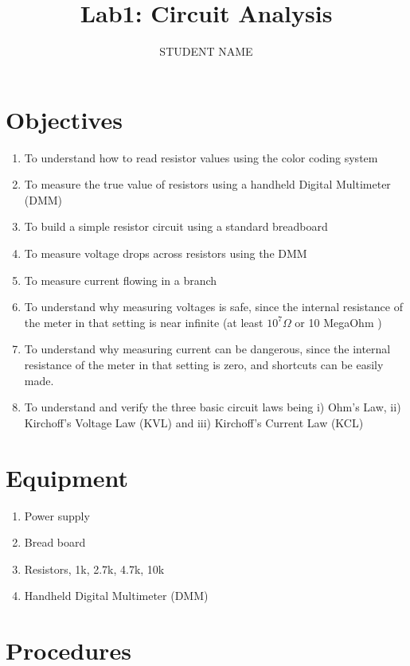 \documentclass[11pt,letterpaper]{article}
\author{STUDENT NAME}
\title{Lab1: Circuit Analysis}
\begin{document}
\maketitle

\section{Objectives}

\begin{enumerate}
\item To understand how to read resistor values using the color coding system
\item To measure the true value of resistors using a handheld Digital Multimeter (DMM)
\item To build a simple resistor circuit using a standard breadboard
\item To measure voltage drops across resistors using the DMM
\item To measure current flowing in a branch
\item To understand why measuring voltages is safe, since the internal resistance of the meter in that setting is near infinite (at least $10^7 \Omega$ or 10 MegaOhm  )
\item To understand why measuring current can be dangerous, since the internal resistance of the meter in that setting is zero, and shortcuts can be easily made.
\item To understand and verify the three basic circuit laws being i) Ohm’s Law, ii) Kirchoff’s Voltage Law (KVL) and iii) Kirchoff’s Current Law (KCL)
\end{enumerate}

\section{Equipment}

\begin{enumerate}
\item Power supply
\item Bread board
\item Resistors, 1k, 2.7k, 4.7k, 10k
\item Handheld Digital Multimeter (DMM)
\end{enumerate}

\section{Procedures}
\end{document}
